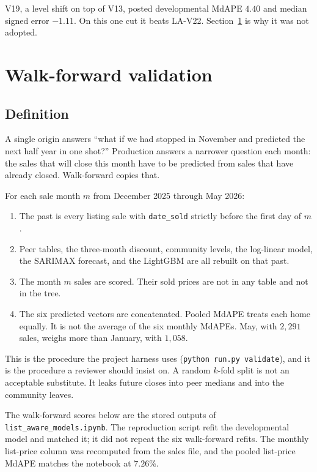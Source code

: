\documentclass[11pt]{article}
\newcommand{\modelid}{LA-V22}
\begin{document}
V19, a level shift on top of V13, posted developmental MdAPE \(4.40\) and median signed error \(-1.11\). On this one cut it beats \modelid{}. Section~\ref{sec:walk} is why it was not adopted.

\section{Walk-forward validation}
\label{sec:walk}

\subsection{Definition}

A single origin answers ``what if we had stopped in November and predicted the next half year in one shot?'' Production answers a narrower question each month: the sales that will close this month have to be predicted from sales that have already closed. Walk-forward copies that.

For each sale month \(m\) from December 2025 through May 2026:

\begin{enumerate}
\item The past is every listing sale with \texttt{date\_sold} strictly before the first day of \(m\).
\item Peer tables, the three-month discount, community levels, the log-linear model, the SARIMAX forecast, and the LightGBM are all rebuilt on that past.
\item The month \(m\) sales are scored. Their sold prices are not in any table and not in the tree.
\item The six predicted vectors are concatenated. Pooled MdAPE treats each home equally. It is not the average of the six monthly MdAPEs. May, with \(2{,}291\) sales, weighs more than January, with \(1{,}058\).
\end{enumerate}

This is the procedure the project harness uses (\texttt{python run.py validate}), and it is the procedure a reviewer should insist on. A random \(k\)-fold split is not an acceptable substitute. It leaks future closes into peer medians and into the community leaves.

The walk-forward scores below are the stored outputs of \texttt{list\_aware\_models.ipynb}. The reproduction script refit the developmental model and matched it; it did not repeat the six walk-forward refits. The monthly list-price column was recomputed from the sales file, and the pooled list-price MdAPE matches the notebook at \(7.26\%\).
\end{document}
